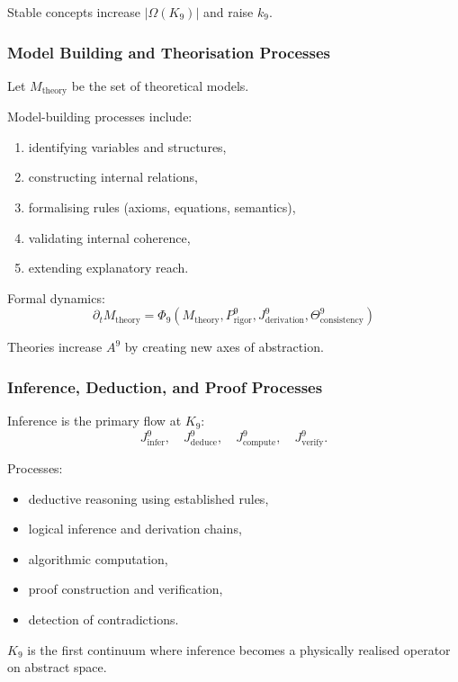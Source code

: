 Stable concepts increase $|\Omega(K_9)|$ and raise $k_9$.

\subsubsection{Model Building and Theorisation Processes}

Let $M_{\text{theory}}$ be the set of theoretical models.

Model-building processes include:
\begin{enumerate}
    \item identifying variables and structures,
    \item constructing internal relations,
    \item formalising rules (axioms, equations, semantics),
    \item validating internal coherence,
    \item extending explanatory reach.
\end{enumerate}

Formal dynamics:
\[
\partial_t M_{\text{theory}}
= \Phi_9(M_{\text{theory}}, P^9_{\text{rigor}}, 
         J^9_{\text{derivation}}, 
         \Theta^9_{\text{consistency}})
\]

Theories increase $A^9$ by creating new axes of abstraction.

\subsubsection{Inference, Deduction, and Proof Processes}

Inference is the primary flow at $K_9$:
\[
J^9_{\text{infer}}, \quad J^9_{\text{deduce}}, \quad 
J^9_{\text{compute}}, \quad J^9_{\text{verify}}.
\]

Processes:
\begin{itemize}
    \item deductive reasoning using established rules,
    \item logical inference and derivation chains,
    \item algorithmic computation,
    \item proof construction and verification,
    \item detection of contradictions.
\end{itemize}

$K_9$ is the first continuum where inference 
becomes a physically realised operator on abstract space.

